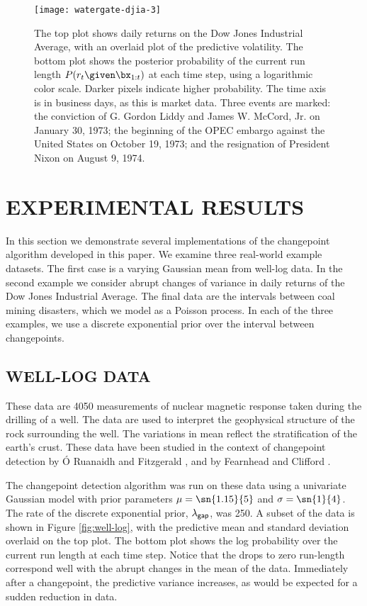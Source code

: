 \documentclass[]{article}
\begin{document}
      \begin{figure*}[t]
	\centering
	\texttt{[image: watergate-djia-3]}
	\vskip -0.5cm
	\caption{The top plot shows daily returns on the Dow Jones
	  Industrial Average, with an overlaid plot of the predictive
	  volatility.  The bottom plot shows the posterior probability of
	  the current run length $P(r_{t}\given \bx_{1:t})$ at each time
	  step, using a logarithmic color scale.  Darker pixels indicate
	  higher probability.  The time axis is in business days, as this
	  is market data.  Three events are marked: the conviction of
	  G. Gordon Liddy and James W. McCord, Jr. on January 30, 1973; the
	  beginning of the OPEC embargo against the United States on
	  October 19, 1973; and the resignation of President Nixon on
	  August 9, 1974.}
	\label{fig:watergate-djia}
      \end{figure*}
   
  \section{EXPERIMENTAL RESULTS}
    In this section we demonstrate several implementations of the
    changepoint algorithm developed in this paper.  We examine three
    real-world example datasets.  The first case is a varying Gaussian mean
    from well-log data.  In the second example we consider abrupt changes
    of variance in daily returns of the Dow Jones Industrial Average.  The
    final data are the intervals between coal mining disasters, which we
    model as a Poisson process.  In each of the three examples, we use a
    discrete exponential prior over the interval between changepoints.

    \subsection{WELL-LOG DATA}
      These data are 4050 measurements of nuclear magnetic response taken
      during the drilling of a well.  The data are used to interpret the
      geophysical structure of the rock surrounding the well.  The
      variations in mean reflect the stratification of the earth's crust.
      These data have been studied in the context of changepoint detection
      by \'{O} Ruanaidh and Fitzgerald \cite{oruanaidh-fitzgerald-1996a},
      and by Fearnhead and Clifford \cite{fearnhead-clifford-2003a}.

      The changepoint detection algorithm was run on these data using a
      univariate Gaussian model with prior parameters $\mu = \sn{1.15}{5}$
      and $\sigma = \sn{1}{4}$.  The rate of the discrete exponential
      prior, $\lambda_{\sf{gap}}$, was 250.  A subset of the data is
      shown in Figure \ref{fig:well-log}, with the predictive mean and
      standard deviation overlaid on the top plot.  The bottom plot shows
      the log probability over the current run length at each time step.
      Notice that the drops to zero run-length correspond well with the
      abrupt changes in the mean of the data.  Immediately after a
      changepoint, the predictive variance increases, as would be expected
      for a sudden reduction in data.
    
\end{document}
